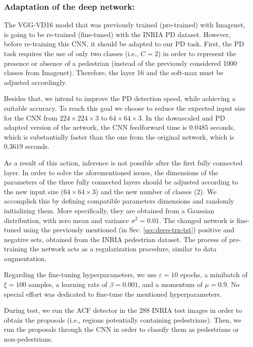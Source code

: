 \documentclass[5p,time]{elsarticle}
\begin{document}
\subsubsection{Adaptation of the deep network:}\label{sec:Adaptation-of-the-deep-network}
 
The VGG-VD16 model that was previously trained (pre-trained) with Imagenet, is going to be re-trained (fine-tuned) with the INRIA PD dataset. However, before re-training this CNN, it should be adapted to our PD task. First, the PD task requires the use of only two classes (i.e., $C=2$) in order to represent the presence or absence of a pedestrian (instead of the previously considered 1000 classes from Imagenet). Therefore, the layer 16 and the soft-max must be adjusted accordingly.

Besides that, we intend to improve the PD detection speed, while achieving a suitable accuracy. To reach this goal we choose to reduce the expected input size for the CNN from $224 \times 224 \times 3$ to $64 \times 64 \times 3$. In the downscaled and PD adapted version of the network, the CNN feedforward time is $0.0485$ seconds, which is substantially faster than the one from the original network, which is $0.3619$ seconds.

As a result of this action, inference is not possible after the first fully connected layer. In order to solve the aforementioned issues, the dimensions of the parameters of the three fully connected layers should be adjusted according to the new input size ($64 \times 64 \times 3$) and the new number of classes (2). We accomplish this by defining compatible parameters dimensions and randomly initializing them. More specifically, they are obtained from a Gaussian distribution, with zero mean and variance $\sigma^2 =0.01$. The changed network is fine-tuned using the previously mentioned (in Sec. \ref{sec:deep-trn-tst}) positive and negative sets, obtained from the INRIA pedestrian dataset. The process of pre-training the network acts as a regularization procedure, similar to data augmentation.

Regarding the fine-tuning hyperparameters, we use $\varepsilon=10$
epochs, a minibatch of $\xi=100$ samples, a learning rate of $\beta=
0.001$, and a momentum of $\mu=0.9$. No special effort was dedicated
to fine-tune the mentioned hyperparameters.

During test, we run the ACF detector in the 288 INRIA test images in
order to obtain the proposals (i.e., regions potentially containing
pedestrians). Then, we run the proposals through the CNN in order to
classify them as pedestrians or non-pedestrians.
\end{document}
